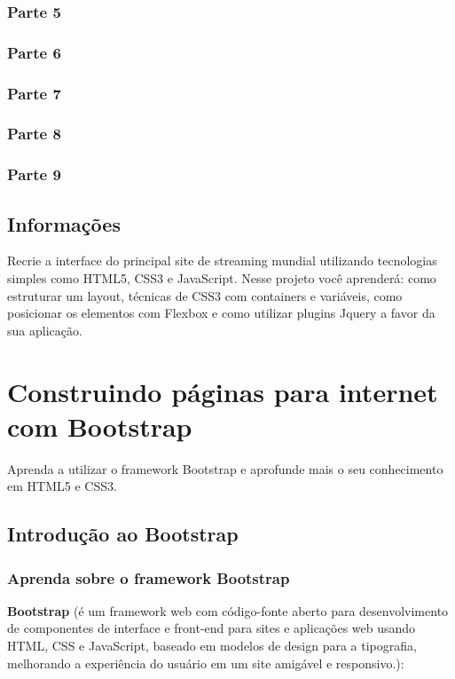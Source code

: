 \documentclass[12pt,a4paper]{article}
\begin{document}
	\subsubsection{Parte 5}
	
	\subsubsection{Parte 6}
	
	\subsubsection{Parte 7}
	
	\subsubsection{Parte 8}
	
	\subsubsection{Parte 9}
	
	\subsection{Informações}
	
	Recrie a interface do principal site de streaming mundial utilizando tecnologias simples como HTML5, CSS3 e JavaScript. Nesse projeto você aprenderá: como estruturar um layout, técnicas de CSS3 com containers e variáveis, como posicionar os elementos com Flexbox e como utilizar plugins Jquery a favor da sua aplicação.
	
	\section{Construindo páginas para internet com Bootstrap}
	
	Aprenda a utilizar o framework Bootstrap e aprofunde mais o seu conhecimento em HTML5 e CSS3.
	
	\subsection{Introdução ao Bootstrap}
	\subsubsection{Aprenda sobre o framework Bootstrap}
	
	\textbf{Bootstrap} (é um framework web com código-fonte aberto para desenvolvimento de componentes de interface e front-end para sites e aplicações web usando HTML, CSS e JavaScript, baseado em modelos de design para a tipografia, melhorando a experiência do usuário em um site amigável e responsivo.): 
	
\end{document}
